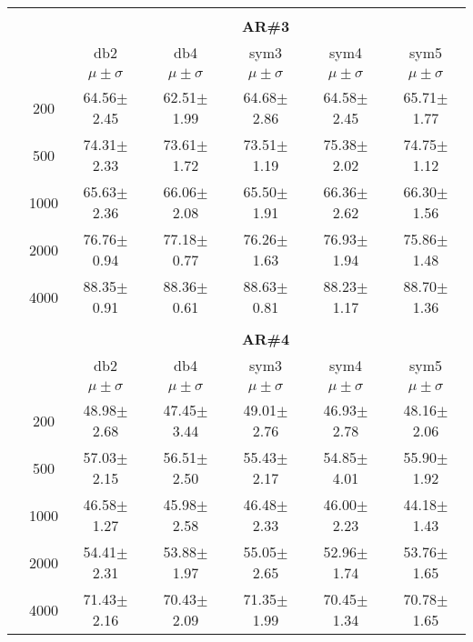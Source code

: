\begin{table}[H]
\begin{tabular}{|c|c|c c c c c|}
	



\\ \midrule
\multicolumn{7}{c}{}\\ 



\cline{3-7}
\multicolumn{2}{c|}{\multirow{3}{*}{}} & \multicolumn{5}{c|}{\textbf{AR\#3}}   \\\cline{3-7} 

\multicolumn{2}{c|}{}  & db2 & db4 & sym3 & sym4 & sym5 \\\cline{3-7}
\multicolumn{2}{c|}{}& $\mu \pm \sigma$ & $\mu \pm \sigma$ & $\mu \pm \sigma$ & $\mu \pm \sigma$ & $\mu \pm \sigma$ \\\hline

\multicolumn{1}{|c|}{ \multirow{5}{*}{\rotatebox[origin=c]{90}{\textbf{Neurônios}}} }
&200	&64.56$\pm$2.45	&62.51$\pm$1.99	&64.68$\pm$2.86	&64.58$\pm$2.45	&65.71$\pm$1.77\\\cline{2-7}
&500	&74.31$\pm$2.33	&73.61$\pm$1.72	&73.51$\pm$1.19	&75.38$\pm$2.02	&74.75$\pm$1.12\\\cline{2-7}
&1000	&65.63$\pm$2.36	&66.06$\pm$2.08	&65.50$\pm$1.91	&66.36$\pm$2.62 &66.30$\pm$1.56\\\cline{2-7}
&2000	&76.76$\pm$0.94	&77.18$\pm$0.77	&76.26$\pm$1.63	&76.93$\pm$1.94	&75.86$\pm$1.48\\\cline{2-7}
&4000	&88.35$\pm$0.91	&88.36$\pm$0.61	&88.63$\pm$0.81	&88.23$\pm$1.17	&88.70$\pm$1.36



\\\midrule 
\multicolumn{7}{c}{}\\ 



\cline{3-7}
\multicolumn{2}{c|}{\multirow{3}{*}{}} & \multicolumn{5}{c|}{\textbf{AR\#4}}   \\\cline{3-7} 

\multicolumn{2}{c|}{}  & db2 & db4 & sym3 & sym4 & sym5 \\\cline{3-7}
\multicolumn{2}{c|}{}& $\mu \pm \sigma$ & $\mu \pm \sigma$ & $\mu \pm \sigma$ & $\mu \pm \sigma$ & $\mu \pm \sigma$ \\\hline

\multicolumn{1}{|c|}{ \multirow{5}{*}{\rotatebox[origin=c]{90}{\textbf{Neurônios}}} }
&200	&48.98$\pm$2.68	&47.45$\pm$3.44	&49.01$\pm$2.76	&46.93$\pm$2.78	&48.16$\pm$2.06\\\cline{2-7}
&500	&57.03$\pm$2.15	&56.51$\pm$2.50	&55.43$\pm$2.17	&54.85$\pm$4.01	&55.90$\pm$1.92\\\cline{2-7}
&1000	&46.58$\pm$1.27	&45.98$\pm$2.58	&46.48$\pm$2.33	&46.00$\pm$2.23	&44.18$\pm$1.43\\\cline{2-7}
&2000	&54.41$\pm$2.31	&53.88$\pm$1.97	&55.05$\pm$2.65 &52.96$\pm$1.74	&53.76$\pm$1.65\\\cline{2-7}
&4000	&71.43$\pm$2.16	&70.43$\pm$2.09	&71.35$\pm$1.99	&70.45$\pm$1.34	&70.78$\pm$1.65

\\\midrule
	\end{tabular}
\end{table} %

